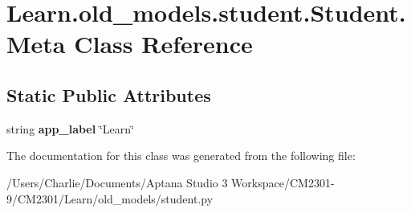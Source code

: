 \hypertarget{class_learn_1_1old__models_1_1student_1_1_student_1_1_meta}{\section{Learn.\-old\-\_\-models.\-student.\-Student.\-Meta Class Reference}
\label{class_learn_1_1old__models_1_1student_1_1_student_1_1_meta}
}
\subsection*{Static Public Attributes}
\begin{DoxyCompactItemize}
\item 
\hypertarget{class_learn_1_1old__models_1_1student_1_1_student_1_1_meta_a7350cc4280e66a5535cd502c44743c92}{string {\bfseries app\-\_\-label} \char`\"{}Learn\char`\"{}}\label{class_learn_1_1old__models_1_1student_1_1_student_1_1_meta_a7350cc4280e66a5535cd502c44743c92}

\end{DoxyCompactItemize}


The documentation for this class was generated from the following file\-:\begin{DoxyCompactItemize}
\item 
/\-Users/\-Charlie/\-Documents/\-Aptana Studio 3 Workspace/\-C\-M2301-\/9/\-C\-M2301/\-Learn/old\-\_\-models/student.\-py\end{DoxyCompactItemize}
